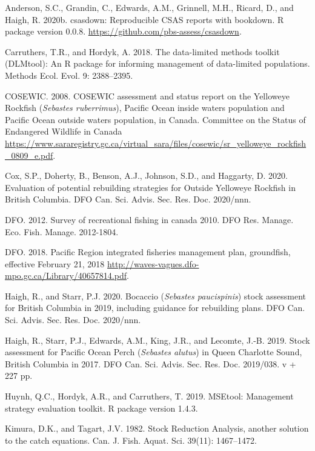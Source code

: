 \documentclass[11pt]{book}
\begin{document}
\leavevmode\hypertarget{ref-csasdown}{}%
Anderson, S.C., Grandin, C., Edwards, A.M., Grinnell, M.H., Ricard, D., and Haigh, R. 2020b. csasdown: Reproducible CSAS reports with bookdown. R package version 0.0.8. \url{https://github.com/pbs-assess/csasdown}.

\leavevmode\hypertarget{ref-carruthers2018}{}%
Carruthers, T.R., and Hordyk, A. 2018. The data-limited methods toolkit (DLMtool): An R package for informing management of data-limited populations. Methods Ecol. Evol. 9: 2388--2395.

\leavevmode\hypertarget{ref-cosewic2008}{}%
COSEWIC. 2008. COSEWIC assessment and status report on the Yelloweye Rockfish (\emph{Sebastes ruberrimus}), Pacific Ocean inside waters population and Pacific Ocean outside waters population, in Canada. Committee on the Status of Endangered Wildlife in Canada \url{https://www.sararegistry.gc.ca/virtual_sara/files/cosewic/sr_yelloweye_rockfish_0809_e.pdf}.

\leavevmode\hypertarget{ref-cox2020}{}%
Cox, S.P., Doherty, B., Benson, A.J., Johnson, S.D., and Haggarty, D. 2020. Evaluation of potential rebuilding strategies for Outside Yelloweye Rockfish in British Columbia. DFO Can. Sci. Advis. Sec. Res. Doc. 2020/nnn.

\leavevmode\hypertarget{ref-dfo2012}{}%
DFO. 2012. Survey of recreational fishing in canada 2010. DFO Res. Manage. Eco. Fish. Manage. 2012-1804.

\leavevmode\hypertarget{ref-ifmp2018}{}%
DFO. 2018. Pacific Region integrated fisheries management plan, groundfish, effective February 21, 2018 \url{http://waves-vagues.dfo-mpo.gc.ca/Library/40657814.pdf}.

\leavevmode\hypertarget{ref-haigh2020}{}%
Haigh, R., and Starr, P.J. 2020. Bocaccio (\emph{Sebastes paucispinis}) stock assessment for British Columbia in 2019, including guidance for rebuilding plans. DFO Can. Sci. Advis. Sec. Res. Doc. 2020/nnn.

\leavevmode\hypertarget{ref-haigh2019}{}%
Haigh, R., Starr, P.J., Edwards, A.M., King, J.R., and Lecomte, J.-B. 2019. Stock assessment for Pacific Ocean Perch (\emph{Sebastes alutus}) in Queen Charlotte Sound, British Columbia in 2017. DFO Can. Sci. Advis. Sec. Res. Doc. 2019/038. v + 227 pp.

\leavevmode\hypertarget{ref-huynh_msetool_2019}{}%
Huynh, Q.C., Hordyk, A.R., and Carruthers, T. 2019. MSEtool: Management strategy evaluation toolkit. R package version 1.4.3.

\leavevmode\hypertarget{ref-kimura1982}{}%
Kimura, D.K., and Tagart, J.V. 1982. Stock Reduction Analysis, another solution to the catch equations. Can. J. Fish. Aquat. Sci. 39(11): 1467--1472.
\end{document}
